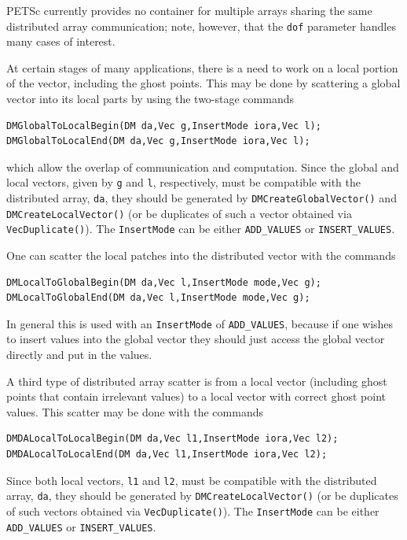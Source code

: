 PETSc currently provides no container for multiple arrays sharing the
same distributed array communication; note, however, that the \lstinline{dof}
parameter handles many cases of interest.

At certain stages of many applications, there is a need to work
on a local portion of the vector, including the ghost points.
This may be done by scattering a global vector into its
local parts by using the two-stage commands
\begin{lstlisting}
DMGlobalToLocalBegin(DM da,Vec g,InsertMode iora,Vec l);
DMGlobalToLocalEnd(DM da,Vec g,InsertMode iora,Vec l);
\end{lstlisting}
which allow the overlap of communication and computation.
Since the global and local vectors, given by \lstinline{g} and \lstinline{l}, respectively,
must be compatible with the distributed array, \lstinline{da}, they should be
generated by \lstinline{DMCreateGlobalVector()}
and \lstinline{DMCreateLocalVector()}
(or be duplicates of such a vector obtained via \lstinline{VecDuplicate()}).
The \lstinline{InsertMode} can be either \lstinline{ADD_VALUES} or \lstinline{INSERT_VALUES}.

One can scatter the local patches into the distributed vector
with the commands
\begin{lstlisting}
DMLocalToGlobalBegin(DM da,Vec l,InsertMode mode,Vec g);
DMLocalToGlobalEnd(DM da,Vec l,InsertMode mode,Vec g);
\end{lstlisting}
In general this is used with an \lstinline{InsertMode} of \lstinline{ADD_VALUES}, because if one wishes to insert values into the global vector they should
just access the global vector directly and put in the values.

A third type of distributed array scatter is from a local
vector (including ghost points that contain irrelevant values) to
a local vector with correct ghost point values.
This scatter may be done with the commands
\begin{lstlisting}
DMDALocalToLocalBegin(DM da,Vec l1,InsertMode iora,Vec l2);
DMDALocalToLocalEnd(DM da,Vec l1,InsertMode iora,Vec l2);
\end{lstlisting}
Since both local vectors, \lstinline{l1} and \lstinline{l2},
must be compatible with the distributed array, \lstinline{da}, they should be
generated by \lstinline{DMCreateLocalVector()}
(or be duplicates of such vectors obtained via \lstinline{VecDuplicate()}).
The \lstinline{InsertMode} can be either \lstinline{ADD_VALUES} or \lstinline{INSERT_VALUES}.

